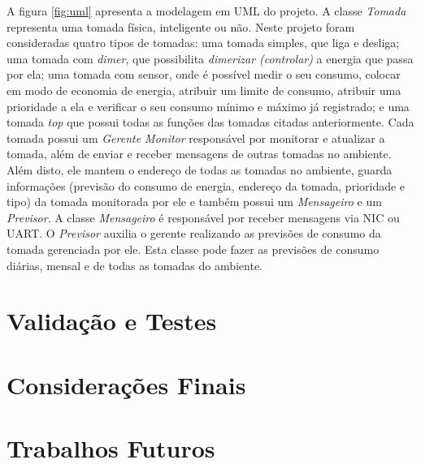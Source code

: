 \documentclass[article,11pt,oneside,a4paper,english,brazil]{abntex2}
\begin{document}
	A figura \ref{fig:uml} apresenta a modelagem em UML do projeto. A classe \textit{Tomada} representa uma tomada física, inteligente ou não. Neste projeto foram consideradas quatro tipos de tomadas: uma tomada simples, que liga e desliga; uma tomada com \textit{dimer}, que possibilita \textit{dimerizar (controlar)} a energia que passa por ela; uma tomada com sensor, onde é possível medir o seu consumo, colocar em modo de economia de energia, atribuir um limite de consumo, atribuir uma prioridade a ela e verificar o seu consumo mínimo e máximo já registrado; e uma tomada \textit{top} que possui todas as funções das tomadas citadas anteriormente. Cada tomada possui um \textit{Gerente Monitor} responsável por monitorar e atualizar a tomada, além de enviar e receber mensagens de outras tomadas no ambiente. Além disto, ele mantem o endereço de todas as tomadas no ambiente, guarda informações (previsão do consumo de energia, endereço da tomada, prioridade e tipo) da tomada monitorada por ele e também possui um \textit{Mensageiro} e um \textit{Previsor}. A classe \textit{Mensageiro} é responsável por receber mensagens via NIC ou UART. O \textit{Previsor} auxilia o gerente realizando as previsões de consumo da tomada gerenciada por ele. Esta classe pode fazer as previsões de consumo diárias, mensal e de todas as tomadas do ambiente. 

\section{Validação e Testes} \label{sec:validacaoetestes}


\section{Considerações Finais} \label{sec:consideracoes}


\section{Trabalhos Futuros} \label{sec:trabalhosfuturos}
\postextual



%
%
\end{document}
